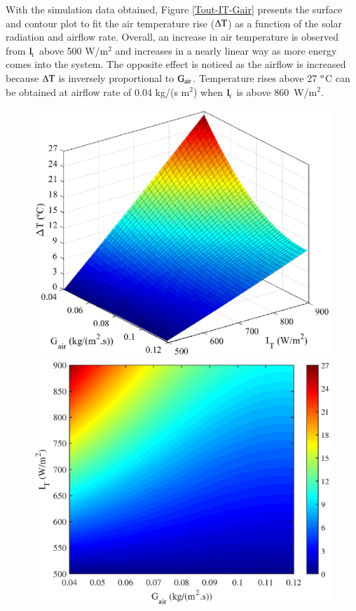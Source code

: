 With the simulation data obtained, Figure \ref{Tout-IT-Gair} presents the surface and contour plot to fit the air temperature rise ($\Delta \rm{T}$) as a function of the solar radiation and airflow rate. Overall, an increase in air temperature is observed from $\rm{I_{\!_T}}$ above 500 W/m$^2$ and increases in a nearly linear way as more energy comes into the system. The opposite effect is noticed as the airflow is increased because $\Delta \rm{T}$ is inversely proportional to $\rm{G_{air}}$. Temperature rises above 27 $^{\rm{o}}$C can be obtained at airflow rate of 0.04 kg/(s m$^2$) when $\rm{I_{\!_T}}$ is above \mbox{860 W/m$^2$}.

\begin{figure}[ht!]
	\begin{minipage}{0.49\columnwidth}
		\includegraphics[scale=0.49]{figs/Tout_x_GT_Gair.eps}
	\end{minipage}
	\begin{minipage}{0.49\columnwidth}
		\includegraphics[scale=0.49]{figs/contour_dT.eps}

\end{minipage}
\end{figure}
